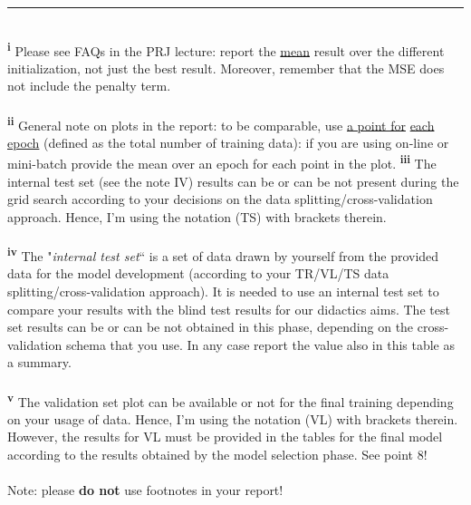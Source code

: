 \documentclass[12pt, letterpaper]{article}  %
\begin{document}
\noindent\rule{6cm}{0.4pt} \\
\noindent \textsuperscript{\textbf{i}} Please see FAQs in the PRJ lecture: report the \underline{mean} result over the different initialization, not just the best result. Moreover, remember that the  MSE does not  include the penalty term. \\ \\
\textsuperscript{\textbf{ii}} General note on plots in the report: to be comparable,  use  \underline{a point for} \underline{each epoch} (defined as the total number of training data): if you are using on-line or mini-batch provide the mean over an epoch for each point in the plot.
\textsuperscript{\textbf{iii}}  The internal test set (see the note IV) results can be or can be not present during the grid search according to your decisions on the  data splitting/cross-validation approach. Hence, I’m using the notation (TS) with brackets therein. \\ \\ 
\textsuperscript{\textbf{iv}} The "\textit{internal test set}`` is a set of data drawn by yourself from the provided data for the model development  (according to your  TR/VL/TS data splitting/cross-validation approach). It is needed to use an internal test set to compare your results with the blind test results for our didactics aims. The test set results can be or can be not obtained in this phase, depending on the  cross-validation schema that you use. In any case report the value also in this table as a summary. \\ \\ 
\textsuperscript{\textbf{v}} The validation set  plot can be available or not for the final training depending on your usage of data. Hence, I’m using the notation (VL) with brackets therein. However, the results for VL must be provided in the tables for the final model according to the results obtained by the model selection phase. See point 8!   \\ \\

\noindent Note: please \textbf{do not} use footnotes in your report!
\end{document}
